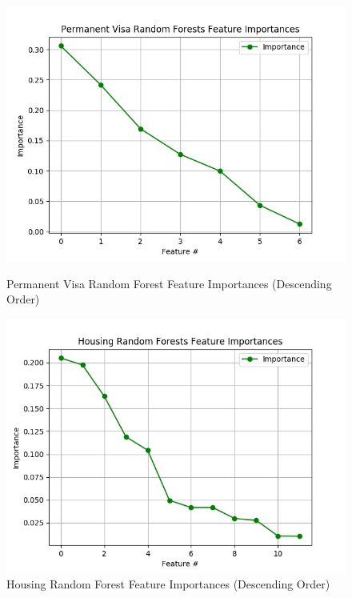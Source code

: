 \documentclass[h]{article}
\begin{document}
 \begin{figure}[H]
    \endminipage\hfill 
      \includegraphics[width=1\textwidth,keepaspectratio]{permanent_visa_random_forests_feature_importances.jpg} 
      \caption*{Permanent Visa Random Forest Feature Importances (Descending Order) } 
   \endminipage\hfill
      \includegraphics[width=1\textwidth,keepaspectratio]{housing_random_forests_feature_importances.jpg} 
      \caption*{Housing Random Forest Feature Importances (Descending Order)} 
   \endminipage\hfill
    \endminipage\hfill
\end{figure}
\end{document}
